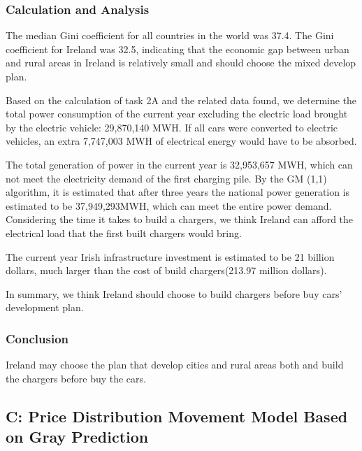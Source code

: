 \documentclass{mcmthesis}
\begin{document}
\subsubsection{Calculation and Analysis}


\par The median Gini coefficient for all countries in the world was 37.4. The Gini coefficient for Ireland was 32.5, indicating that the economic gap between urban and rural areas in Ireland is relatively small and should choose the mixed  develop plan. 

\par Based on the calculation of task 2A and the related data found, we determine the total power consumption of the current year excluding the electric load brought by the electric vehicle: 29,870,140 MWH. If all cars were converted to electric vehicles, an extra 7,747,003 MWH of electrical energy would have to be absorbed.

\par The total generation of power in the current year is 32,953,657 MWH, which can not meet the electricity demand of the first charging pile. By the GM (1,1) algorithm, it is estimated that after three years the national power generation is estimated to be 37,949,293MWH, which can meet the entire power demand. Considering the time it takes to build a chargers, we think Ireland can afford the electrical load that the first built chargers would bring.

\par The current year Irish infrastructure investment is estimated to be 21 billion dollars, much larger than the cost of build chargers(213.97 million dollars).

\par In summary, we think Ireland should choose to build chargers before buy cars' development plan.

\subsubsection{Conclusion}

Ireland may choose the plan that develop cities and rural areas both and build the chargers before buy the cars.


\subsection{C: Price Distribution Movement Model Based on Gray Prediction}
\end{document}
